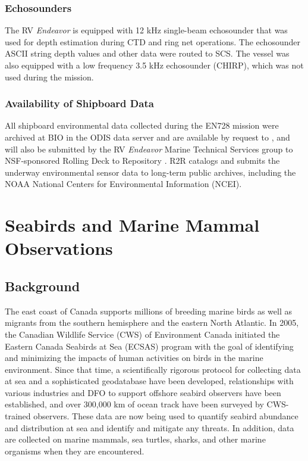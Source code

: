 \documentclass[12pt]{article}\usepackage[]{graphicx}\usepackage[]{color}
\begin{document}
\subsubsection{Echosounders}\label{echosounders}

The RV \emph{Endeavor} is equipped with 12 kHz single-beam echosounder that was used for depth estimation during CTD and ring net operations. The echosounder ASCII string depth values and other data were routed to SCS. The vessel was also equipped with a low frequency 3.5 kHz echosounder (CHIRP), which was not used during the mission.

\subsubsection{Availability of Shipboard Data}\label{availability-of-shipboard-data}

All shipboard environmental data collected during the EN728 mission were archived at BIO in the ODIS data server and are available by request to , and will also be submitted by the RV \emph{Endeavor} Marine Technical Services group to NSF-sponsored Rolling Deck to Repository . R2R catalogs and submits the underway environmental sensor data to long-term public archives, including the NOAA National Centers for Environmental Information (NCEI).

\clearpage

\section{Seabirds and Marine Mammal Observations}\label{seabirds-and-marine-mammal-observations}

\subsection{Background}\label{background-1}

The east coast of Canada supports millions of breeding marine birds as well as migrants from the southern hemisphere and the eastern North Atlantic. In 2005, the Canadian Wildlife Service (CWS) of Environment Canada initiated the Eastern Canada Seabirds at Sea (ECSAS) program with the goal of identifying and minimizing the impacts of human activities on birds in the marine environment. Since that time, a scientifically rigorous protocol for collecting data at sea and a sophisticated geodatabase have been developed, relationships with various industries and DFO to support offshore seabird observers have been established, and over 300,000 km of ocean track have been surveyed by CWS-trained observers. These data are now being used to quantify seabird abundance and distribution at sea and identify and mitigate any threats. In addition, data are collected on marine mammals, sea turtles, sharks, and other marine organisms when they are encountered.
\end{document}
